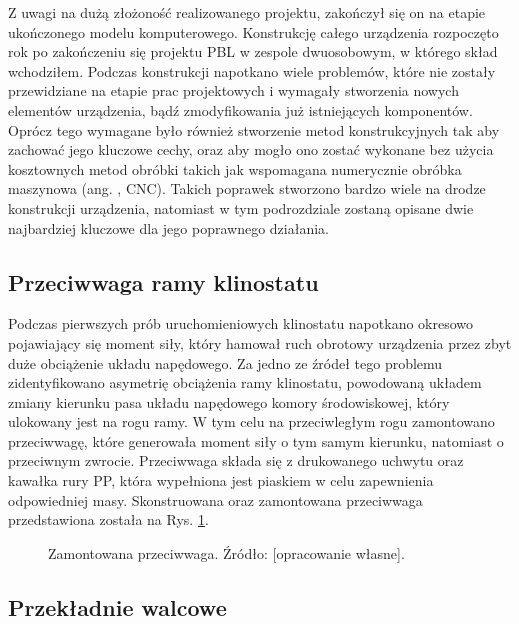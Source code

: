 Z uwagi na dużą złożoność realizowanego projektu, zakończył się on na etapie ukończonego modelu komputerowego. Konstrukcję całego urządzenia rozpoczęto rok po
   zakończeniu się projektu PBL w zespole dwuosobowym, w którego skład wchodziłem. Podczas
    konstrukcji napotkano wiele problemów, które nie zostały przewidziane na etapie prac
     projektowych i wymagały stworzenia nowych elementów urządzenia, bądź zmodyfikowania już
      istniejących komponentów. Oprócz tego wymagane było również stworzenie metod
       konstrukcyjnych tak aby zachować jego kluczowe cechy, oraz aby mogło ono zostać wykonane
        bez użycia kosztownych metod obróbki takich jak wspomagana numerycznie obróbka maszynowa
         (ang. , CNC). Takich poprawek stworzono bardzo
          wiele na drodze konstrukcji urządzenia, natomiast w tym podrozdziale zostaną opisane
           dwie najbardziej kluczowe dla jego poprawnego działania.
           

\subsection{Przeciwwaga ramy klinostatu}

Podczas pierwszych prób uruchomieniowych klinostatu napotkano okresowo pojawiający się moment
 siły, który hamował ruch obrotowy urządzenia przez zbyt duże obciążenie układu napędowego. Za
  jedno ze źródeł tego problemu zidentyfikowano asymetrię obciążenia ramy klinostatu, powodowaną
   układem zmiany kierunku pasa układu napędowego komory środowiskowej, który ulokowany jest na
    rogu ramy. W tym celu na przeciwległym rogu zamontowano przeciwwagę, które generowała moment
     siły o tym samym kierunku, natomiast o przeciwnym zwrocie. Przeciwwaga składa się z
      drukowanego uchwytu oraz kawałka rury PP, która wypełniona jest piaskiem w celu
       zapewnienia odpowiedniej masy. Skonstruowana oraz zamontowana przeciwwaga przedstawiona
        została na Rys. \ref{fig:przeciwwaga}.

\begin{figure}[H]
	\centering
	\setlength{\fboxsep}{0pt}
	\setlength{\fboxrule}{1pt}
	\caption{Zamontowana przeciwwaga. Źródło: [opracowanie własne].} 
	\label{fig:przeciwwaga}
\end{figure}

\subsection{Przekładnie walcowe}

